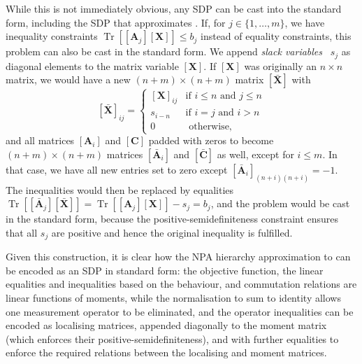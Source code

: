 \documentclass[10pt, a4paper]{article}
\numberwithin{equation}{section} %
\theoremstyle{definition}
\theoremstyle{plain}
\newcommand{\dintv}[2]{\mathopen\{#1,\ldots,#2\mathclose\}}
\newcommand{\?}{\mathrel{?}} %
\newcommand{\matr}[2][]{\left[\mathbf{#2}#1\right]} %
\newcommand{\Tr}[2][]{\mathop{\mathrm{Tr}#1}\left[ #2 \right]} %
\begin{document}
                    While this is not immediately obvious, any SDP can be cast into the standard form, including the SDP that approximates . If, for \(j\in\dintv{1}{m}\), we have inequality constraints \(\Tr{\matr[_j]{A}\matr{X}} \leq b_j\) instead of equality constraints, this problem can also be cast in the standard form. We append \emph{slack variables}~\cite[Ch. 4.1.3]{BoydVand} \(s_j\) as diagonal elements to the matrix variable \(\matr{X}\). If \(\matr{X}\) was originally an \(n\times{n}\) matrix, we would have a new \((n+m)\times{(n+m)}\) matrix \(\matr{\bar{X}}\) with
                    \begin{equation}
                      \matr{\bar{X}}_{ij} = \begin{cases}
                        \matr{X}_{ij} & \text{if } i \leq n \text{ and } j \leq n \\
                        s_{i-n} & \text{if } i = j \text{ and } i > n \\
                        0 & \text{ otherwise,}
                      \end{cases}
                    \end{equation}
                    and all matrices \(\matr[_i]{A}\) and \(\matr{C}\) padded with zeros to become \((n+m)\times(n+m)\) matrices \(\matr[_i]{\bar{A}}\) and \(\matr{\bar{C}}\) as well, except for \(i \leq m\). In that case, we have all new entries set to zero except \(\matr[_i]{\bar{A}}_{(n+i)(n+i)} = -1\). The inequalities would then be replaced by equalities \(\Tr{\matr[_j]{\bar{A}}\matr{\bar{X}}} = \Tr{\matr[_j]{A}\matr{X}} - s_j = b_j\), and the problem would be cast in the standard form, because the positive-semidefiniteness constraint ensures that all \(s_j\) are positive and hence the original inequality is fulfilled.

                    Given this construction, it is clear how the NPA hierarchy approximation to  can be encoded as an SDP in standard form: the objective function, the linear equalities and inequalities based on the behaviour, and commutation relations are linear functions of moments, while the normalisation to sum to identity allows one measurement operator to be eliminated, and the operator inequalities can be encoded as localising matrices, appended diagonally to the moment matrix (which enforces their positive-semidefiniteness), and with further equalities to enforce the required relations between the localising and moment matrices.
\end{document}
